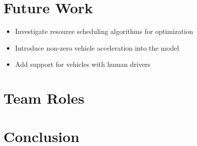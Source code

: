 \documentclass[11pt,letterpaper]{article}
\begin{document}
\section{Future Work}

\begin{itemize}
\setlength{\itemsep}{0pt}
\setlength{\parskip}{0pt}
\item Investigate resource scheduling algorithms for optimization
\item Introduce non-zero vehicle acceleration into the model
\item Add support for vehicles with human drivers
\end{itemize}

\section{Team Roles}


\section{Conclusion}


\newpage

\end{document}
